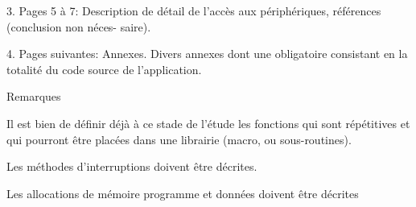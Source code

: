 \documentclass[11pt]{article}
\begin{document}
3. Pages 5 à 7: Description de détail de l’accès aux périphériques, références (conclusion non néces-
saire).

4. Pages suivantes: Annexes. Divers annexes dont une obligatoire consistant en la totalité du code
source de l’application.

Remarques

Il est bien de définir déjà à ce stade de l’étude les fonctions qui sont répétitives et qui pourront être placées
dans une librairie (macro, ou sous-routines).

Les méthodes d’interruptions doivent être décrites.

Les allocations de mémoire programme et données doivent être décrites
\end{document}
